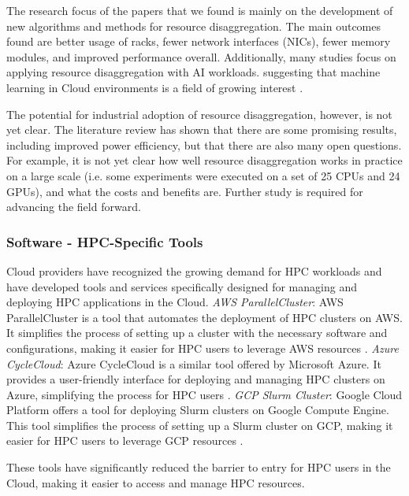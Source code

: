     The research focus of the papers that we found is mainly on the development of new algorithms and methods for resource disaggregation. The main outcomes found are better usage of racks, fewer network interfaces (NICs), fewer memory modules, and improved performance overall. Additionally, many studies focus on applying resource disaggregation with AI workloads. suggesting that machine learning in Cloud environments is a field of growing interest \cite{michelogiannakis_case_2022, michelogiannakis_efficient_2023, copik_software_2024}.

    The potential for industrial adoption of resource disaggregation, however, is not yet clear. The literature review has shown that there are some promising results, including improved power efficiency, but that there are also many open questions. For example, it is not yet clear how well resource disaggregation works in practice on a large scale (i.e. some experiments were executed on a set of 25 CPUs and 24 GPUs), and what the costs and benefits are. Further study is required for advancing the field forward.




    \subsubsection{Software - HPC-Specific Tools}
    Cloud providers have recognized the growing demand for HPC workloads and have developed tools and services specifically designed for managing and deploying HPC applications in the Cloud.
    \textit{AWS ParallelCluster}: AWS ParallelCluster is a tool that automates the deployment of HPC clusters on AWS. It simplifies the process of setting up a cluster with the necessary software and configurations, making it easier for HPC users to leverage AWS resources \cite{guidi2021evaluation}.
    \textit{Azure CycleCloud}: Azure CycleCloud is a similar tool offered by Microsoft Azure. It provides a user-friendly interface for deploying and managing HPC clusters on Azure, simplifying the process for HPC users \cite{guidi2021evaluation}.
    \textit{GCP Slurm Cluster}: Google Cloud Platform offers a tool for deploying Slurm clusters on Google Compute Engine. This tool simplifies the process of setting up a Slurm cluster on GCP, making it easier for HPC users to leverage GCP resources \cite{guidi_10_2021, guidi2021evaluation}.

    These tools have significantly reduced the barrier to entry for HPC users in the Cloud, making it easier to access and manage HPC resources.



